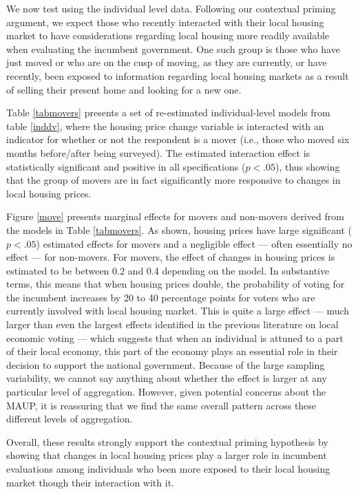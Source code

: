 \documentclass[12pt,a4paper]{article}
\begin{document}
	
	We now test \htwo using the individual level data. Following our contextual priming  argument, we expect those who recently interacted with their local housing market to have considerations regarding local housing more readily available when evaluating the incumbent government. One such group is those who have just moved or who are on the cusp of moving, as they are currently, or have recently, been exposed to information regarding local housing markets as a result of selling their present home and looking for a new one.
	
	
	Table \ref{tabmovers} presents a set of re-estimated individual-level models from table \ref{inddv}, where the housing price change variable is interacted with an indicator for whether or not the respondent is a mover (i.e., those who moved six months before/after being surveyed). The estimated interaction effect is statistically significant and positive in all specifications ($p<.05$), thus showing that the group of movers are in fact significantly more responsive to changes in local housing prices. 
	
	Figure \ref{move} presents marginal effects for movers and non-movers derived from the models in Table \ref{tabmovers}. As shown, housing prices have large significant ($p<.05$) estimated effects for movers and a negligible effect — often essentially no effect — for non-movers. For movers, the effect of changes in housing prices is estimated to be between 0.2 and 0.4 depending on the model. In substantive terms, this means that when housing prices double, the probability of voting for the incumbent increases by 20 to 40 percentage points for voters who are currently involved with local housing market. This is quite a large effect — much larger than even the largest effects identified in the previous literature on local economic voting \citep{healy2017presidential} — which suggests that when an individual is attuned to a part of their local economy, this part of the economy plays an essential role in their decision to support the national government. Because of the large sampling variability, we cannot say anything about whether the effect is larger at any particular level of aggregation. However, given potential concerns about the MAUP, it is reassuring that we find the same overall pattern across these different levels of aggregation. 
	
	Overall, these results strongly support the contextual priming hypothesis by showing that changes in local housing prices play a larger role in incumbent evaluations among individuals who been more exposed to their local housing market though their interaction with it.
	
\end{document}
